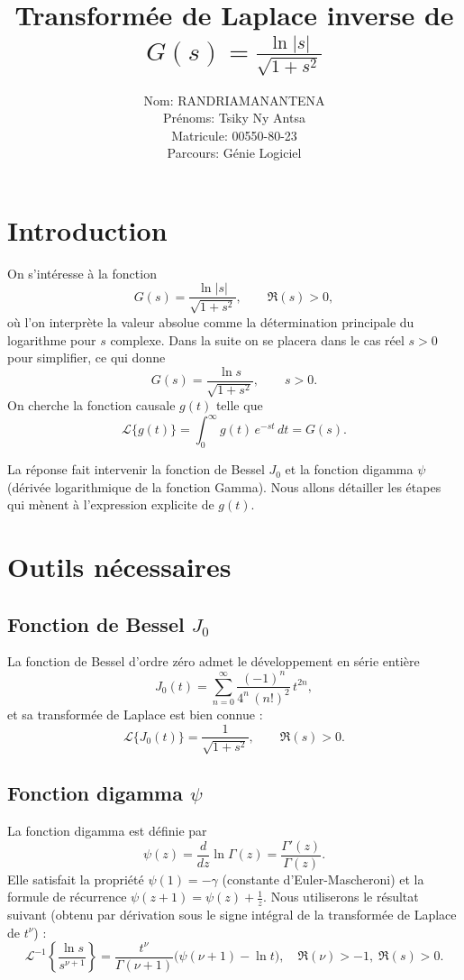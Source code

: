 \documentclass[12pt,a4paper]{article}
\title{\bfseries Transformée de Laplace inverse de \(\displaystyle G(s)=\frac{\ln|s|}{\sqrt{1+s^2}}\)}
\author{Nom: RANDRIAMANANTENA \\
Prénoms: Tsiky Ny Antsa \\
Matricule: 00550-80-23 \\
Parcours: Génie Logiciel}
\date{}
\begin{document}
\maketitle

\section{Introduction}
On s'intéresse à la fonction
\[
G(s) = \frac{\ln|s|}{\sqrt{1+s^2}}, \qquad \Re(s)>0,
\]
où l'on interprète la valeur absolue comme la détermination principale du logarithme pour \(s\) complexe.
Dans la suite on se placera dans le cas réel \(s>0\) pour simplifier, ce qui donne
\[
G(s) = \frac{\ln s}{\sqrt{1+s^2}}, \qquad s>0.
\]
On cherche la fonction causale \(g(t)\) telle que
\[
\mathcal{L}\{g(t)\} = \int_{0}^{\infty} g(t)\,e^{-st}\,dt = G(s).
\]

La réponse fait intervenir la fonction de Bessel \(J_0\) et la fonction digamma \(\psi\) (dérivée logarithmique de la fonction Gamma). Nous allons détailler les étapes qui mènent à l'expression explicite de \(g(t)\).

\section{Outils nécessaires}
\subsection{Fonction de Bessel \(J_0\)}
La fonction de Bessel d'ordre zéro admet le développement en série entière
\begin{equation}\label{eq:J0series}
J_0(t) = \sum_{n=0}^{\infty} \frac{(-1)^n}{4^n\,(n!)^2}\, t^{2n},
\end{equation}
et sa transformée de Laplace est bien connue :
\begin{equation}\label{eq:LJ0}
\mathcal{L}\{J_0(t)\} = \frac{1}{\sqrt{1+s^2}}, \qquad \Re(s)>0.
\end{equation}

\subsection{Fonction digamma \(\psi\)}
La fonction digamma est définie par
\[
\psi(z) = \frac{d}{dz}\ln\Gamma(z) = \frac{\Gamma'(z)}{\Gamma(z)}.
\]
Elle satisfait la propriété \(\psi(1)=-\gamma\) (constante d'Euler-Mascheroni) et la formule de récurrence \(\psi(z+1)=\psi(z)+\frac{1}{z}\).
Nous utiliserons le résultat suivant (obtenu par dérivation sous le signe intégral de la transformée de Laplace de \(t^{\nu}\)) :
\begin{equation}\label{eq:inverseLog}
\mathcal{L}^{-1}\!\left\{ \frac{\ln s}{s^{\nu+1}} \right\}
= \frac{t^{\nu}}{\Gamma(\nu+1)}\bigl(\psi(\nu+1) - \ln t\bigr),
\quad \Re(\nu)>-1,\; \Re(s)>0.
\end{equation}
\end{document}
